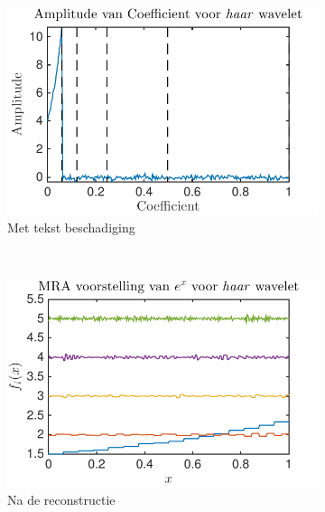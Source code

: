\begin{figure}
    \centering
     \begin{subfigure}[b]{0.45\textwidth}
            \includegraphics[width=\textwidth]{../src/denoising/haar_Noise/coef_exp_haar_4_noise_10}
            \caption{Met tekst beschadiging}
            \label{fig:tiger}
        \end{subfigure}
        ~ %
        \begin{subfigure}[b]{0.45\textwidth}
            \includegraphics[width=\textwidth]{../src/denoising/haar_Noise/MRA_exp_haar_4_noise_10}
            \caption{Na de reconstructie}
            \label{fig:mouse}
        \end{subfigure}
    \begin{subfigure}[b]{0.45\textwidth}

\end{subfigure}
\end{figure}
